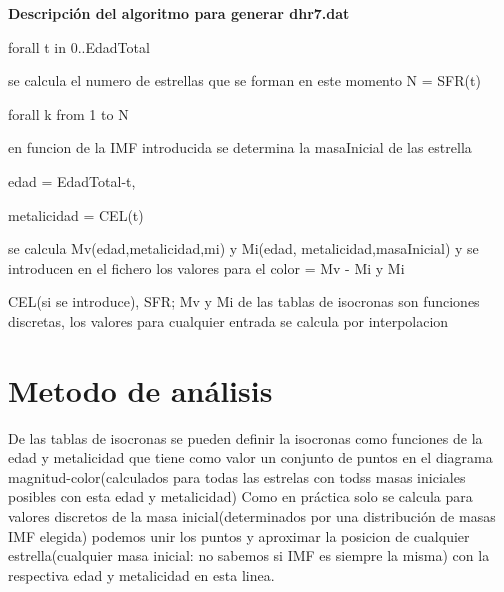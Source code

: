 \documentclass[10pt]{book}
\begin{document}
\textbf{Descripción del algoritmo para generar dhr7.dat}
\begin{description}
\item forall t in 0..EdadTotal
\begin{description}
	\item se calcula  el numero de estrellas que se forman en este momento N = SFR(t)
	\item forall k from 1 to N
		\begin{description}
			\item en funcion de la IMF introducida se determina la masaInicial de las estrella 
			\item edad = EdadTotal-t, 
			\item metalicidad = CEL(t)
			\item se calcula Mv(edad,metalicidad,mi) y Mi(edad, metalicidad,masaInicial) y se introducen en el fichero los valores para el color = Mv - Mi y Mi \\
			
	
		\end{description}
			
\end{description}
\item CEL(si se introduce), SFR; Mv y Mi de las tablas de isocronas son funciones discretas, los valores para cualquier entrada se calcula por interpolacion 
\end{description}

\section*{Metodo de análisis}

De las tablas de isocronas se pueden definir la isocronas como  funciones de la edad y metalicidad  que tiene como valor un conjunto de puntos en el diagrama  magnitud-color(calculados para todas las estrelas con todss masas iniciales posibles con esta edad y metalicidad) Como en práctica solo se calcula para valores discretos de la masa inicial(determinados por una distribución de masas IMF elegida) podemos unir los puntos y aproximar la posicion de cualquier estrella(cualquier masa inicial: no sabemos si IMF es siempre la misma) con la respectiva edad y metalicidad  en esta linea.\\
\end{document}
